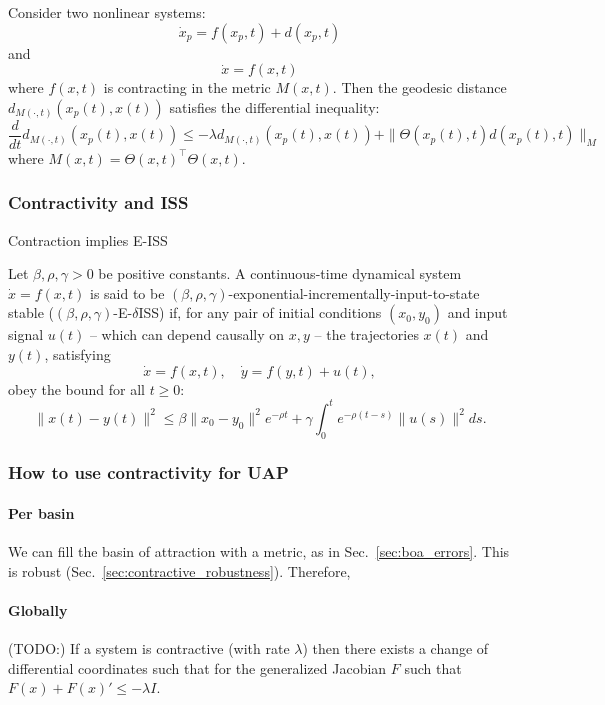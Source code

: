 \documentclass{article}
\newcommand{\ascomment}[1]{\textcolor{ascolor}{(#1)}}
\newcounter{ct}
\begin{document}
\begin{proposition}
Consider two nonlinear systems:
\[
\dot{x}_p = f(x_p, t) + d(x_p, t)
\]
and 
\[
\dot{x} = f(x, t)
\]
where \( f(x, t) \) is contracting in the metric \( M(x,t) \).
 Then the geodesic distance \( d_{M(\cdot,t)}(x_p(t), x(t)) \) satisfies the differential inequality:
\[
\frac{d}{dt} d_{M(\cdot,t)}(x_p(t), x(t)) \leq -\lambda d_{M(\cdot,t)}(x_p(t), x(t)) + \|\Theta(x_p(t),t)d(x_p(t), t)\|_M
\]
where \( M(x,t) = \Theta(x,t)^\top \Theta(x,t) \).
\end{proposition}



\subsubsection{Contractivity and ISS}
Contraction implies E-ISS  \citep{zhang2022adversarially}

\begin{definition}
Let \( \beta, \rho, \gamma > 0 \) be positive constants.
A continuous-time dynamical system  
\(\dot{x} = f(x, t)\)
is said to be \((\beta, \rho, \gamma)\)-exponential-incrementally-input-to-state stable (\((\beta, \rho, \gamma)\)-E-$\delta$ISS) if, for any pair of initial conditions \( (x_0, y_0) \) and input signal \( u(t) \) – which can depend causally on \( x, y \) – the trajectories \( x(t) \) and \( y(t) \), satisfying  
\[
\dot{x} = f(x, t), \quad \dot{y} = f(y, t) + u(t),
\]
obey the bound for all \( t \geq 0 \):
\[
\| x(t) - y(t) \|^2 \leq  \beta \| x_0 - y_0 \|^2 e^{- \rho t} + \gamma \int_0^t e^{-\rho (t-s)} \| u(s) \|^2 ds.
\]
\end{definition}


\subsubsection{How to use contractivity for UAP}
\paragraph{Per basin}
We can fill the basin of attraction with a metric, as in Sec.~\ref{sec:boa_errors}.
This is robust (Sec.~\ref{sec:contractive_robustness}).
Therefore, 


\paragraph{Globally}
\ascomment{TODO:}
If a system is contractive (with rate $\lambda$) then there exists a change of differential coordinates %
such that for the generalized Jacobian $F$ such that $F(x)+F (x)' \leq  -\lambda I$.
\end{document}
